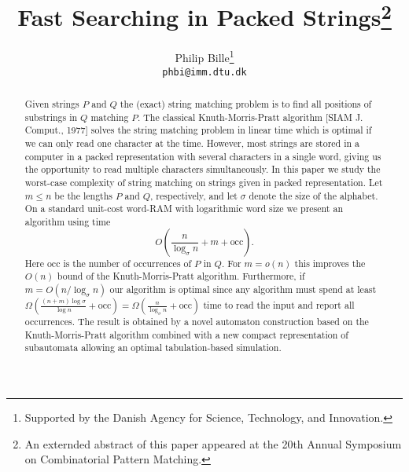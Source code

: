 \documentclass{article}
\title{Fast Searching in Packed Strings\footnote{An externded abstract of this paper appeared at the 20th Annual Symposium on Combinatorial Pattern Matching.}}
\author{Philip Bille\thanks{Supported by the Danish Agency for Science, Technology, and Innovation.}  \\  {\tt phbi@imm.dtu.dk}}
\newcommand{\occ}{\ensuremath{\mathrm{occ}}}
\begin{document}
\maketitle

\begin{abstract}
Given strings $P$ and $Q$ the (exact) string matching problem is to find all positions of substrings in $Q$ matching $P$. The classical Knuth-Morris-Pratt algorithm [SIAM J. Comput., 1977] solves the string matching problem in linear time which is optimal if we can only read one character at the time. However, most strings are stored in a computer in a packed representation with several characters in a single word, giving us the opportunity to read multiple characters simultaneously. In this paper we study the worst-case complexity of string matching on strings given in packed representation. Let $m \leq n$ be the lengths $P$ and $Q$, respectively, and let $\sigma$ denote the size of the alphabet. On a standard unit-cost word-RAM with logarithmic word size we present an algorithm using time 
$$
O\left(\frac{n}{\log_\sigma n} + m + \occ\right).
$$
Here $\occ$ is the number of occurrences of $P$ in $Q$. For $m = o(n)$
this improves the $O(n)$ bound of the Knuth-Morris-Pratt algorithm.
Furthermore, if $m = O(n/\log_\sigma n)$ our algorithm is optimal
since any algorithm must spend at least $\Omega(\frac{(n+m)\log
  \sigma}{\log n} + \occ) = \Omega(\frac{n}{\log_\sigma n} + \occ)$
time to read the input and report all occurrences. The result is
obtained by a novel automaton construction based on the
Knuth-Morris-Pratt algorithm combined with a new compact
representation of subautomata allowing an optimal tabulation-based
simulation. \end{abstract}
\end{document}
